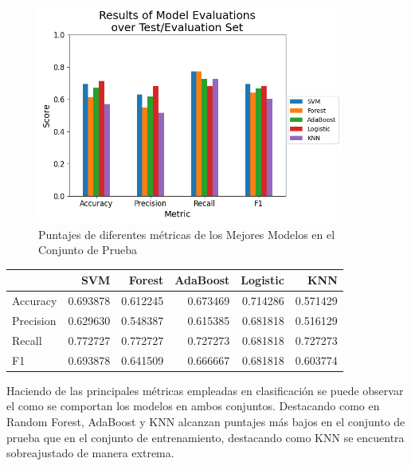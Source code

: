 \documentclass[12pt,a4paper]{article}
\begin{document}
{{            \begin{figure}[hbtp]
                \centering
                \includegraphics[width=0.9\textwidth]{./Resources/5_2.png}
                \caption{Puntajes de diferentes métricas de los Mejores Modelos en el Conjunto de Prueba}
                \label{fig:res_test}
            \end{figure}
            \begin{center}
                \begin{tabular}{lrrrrr}
                    \toprule
                        & SVM & Forest & AdaBoost & Logistic & KNN \\
                    \midrule
                        Accuracy & 0.693878 & 0.612245 & 0.673469 & 0.714286 & 0.571429 \\
                        Precision & 0.629630 & 0.548387 & 0.615385 & 0.681818 & 0.516129 \\
                        Recall & 0.772727 & 0.772727 & 0.727273 & 0.681818 & 0.727273 \\
                        F1 & 0.693878 & 0.641509 & 0.666667 & 0.681818 & 0.603774 \\
                    \bottomrule
                \end{tabular}
            \end{center}

            Haciendo de las principales métricas empleadas en clasificación se puede observar el 
            como se comportan los modelos en ambos conjuntos. Destacando como en Random Forest, 
            AdaBoost y KNN alcanzan puntajes más bajos en el conjunto de prueba que en el conjunto 
            de entrenamiento, destacando como KNN se encuentra sobreajustado de manera extrema. \\ 

}}
\end{document}
